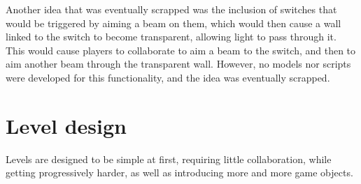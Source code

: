 			Another idea that was eventually scrapped was the inclusion of
			switches that would be triggered by aiming a beam on them, which
			would then cause a wall linked to the switch to become transparent,
			allowing light to pass through it. This would cause players to
			collaborate to aim a beam to the switch, and then to aim another
			beam through the transparent wall. However, no models nor scripts
			were developed for this functionality, and the idea was eventually
			scrapped.
			
	\section{Level design} \label{sec:leveldesign}
		Levels are designed to be simple at first, requiring little collaboration,
		while getting progressively harder, as well as introducing more and more
		game objects. 
